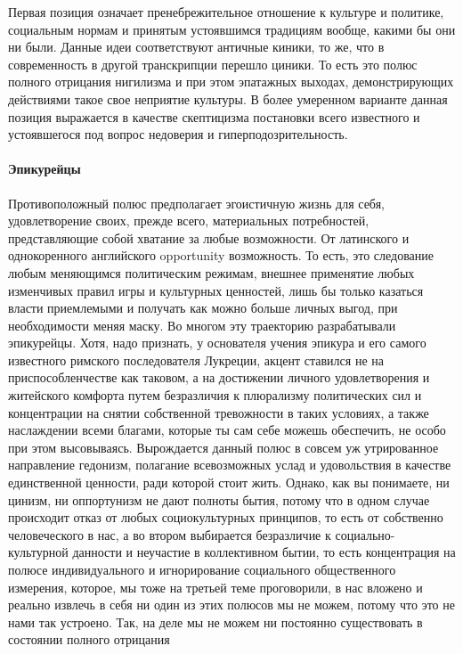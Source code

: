 Первая позиция означает
пренебрежительное отношение к культуре и политике, социальным нормам и принятым
устоявшимся традициям вообще, какими бы они ни были. Данные идеи соответствуют
античные киники, то же, что в современность в другой транскрипции перешло
циники. То есть это полюс полного отрицания нигилизма и при этом эпатажных
выходах, демонстрирующих действиями такое свое неприятие культуры. В более
умеренном варианте данная позиция выражается в качестве скептицизма постановки
всего известного и устоявшегося под вопрос недоверия и гиперподозрительность.


\paragraph{Эпикурейцы}

Противоположный полюс предполагает эгоистичную жизнь для себя, удовлетворение
своих, прежде всего, материальных потребностей, представляющие собой хватание за
любые возможности. От латинского и однокоренного английского opportunity
возможность. То есть, это следование любым меняющимся политическим режимам,
внешнее применятие любых изменчивых правил игры и культурных ценностей, лишь бы
только казаться власти приемлемыми и получать как можно больше личных выгод, при
необходимости меняя маску. Во многом эту траекторию разрабатывали эпикурейцы.
Хотя, надо признать, у основателя учения эпикура и его самого известного
римского последователя Лукреции, акцент ставился не на приспособленчестве как
таковом, а на достижении личного удовлетворения и житейского комфорта путем
безразличия к плюрализму политических сил и концентрации на снятии собственной
тревожности в таких условиях, а также наслаждении всеми благами, которые ты сам
себе можешь обеспечить, не особо при этом высовываясь. Вырождается данный полюс
в совсем уж утрированное направление гедонизм, полагание всевозможных услад и
удовольствия в качестве единственной ценности, ради которой стоит жить. Однако,
как вы понимаете, ни цинизм, ни оппортунизм не дают полноты бытия, потому что в
одном случае происходит отказ от любых социокультурных принципов, то есть от
собственно человеческого в нас, а во втором выбирается безразличие к социально-
культурной данности и неучастие в коллективном бытии, то есть концентрация на
полюсе индивидуального и игнорирование социального общественного измерения,
которое, мы тоже на третьей теме проговорили, в нас вложено и реально извлечь в
себя ни один из этих полюсов мы не можем, потому что это не нами так устроено.
Так, на деле мы не можем ни постоянно существовать в состоянии полного отрицания
